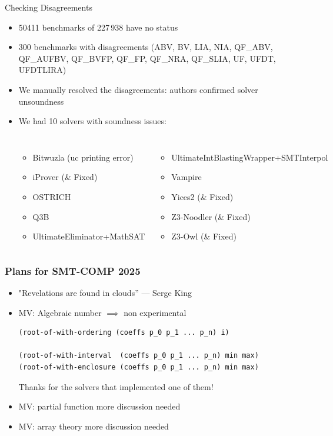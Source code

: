 \documentclass[table]{beamer}
\newcommand\vitem{\vfill\item}
\begin{document}
\begin{frame}{Checking Disagreements}

  \begin{itemize}
  \item  50411 benchmarks of 227\,938 have no status

  \vitem 300 benchmarks with disagreements (ABV,
  BV,
  LIA,
  NIA,
  QF\_ABV,
  QF\_AUFBV,
  QF\_BVFP,
  QF\_FP,
  QF\_NRA,
  QF\_SLIA,
  UF,
  UFDT,
  UFDTLIRA)

  \vitem We manually resolved the disagreements: authors confirmed solver
  unsoundness
  \vitem We had 10 solvers with soundness issues:
  \begin{columns}
    \begin{itemize}
      \item Bitwuzla (uc printing error)
      \item iProver (\& Fixed)
      \item OSTRICH
      \item Q3B
      \item UltimateEliminator+MathSAT
    \end{itemize}
    \begin{itemize}
      \item UltimateIntBlastingWrapper+SMTInterpol
      \item Vampire
      \item Yices2 (\& Fixed)
      \item Z3-Noodler (\& Fixed)
      \item Z3-Owl (\& Fixed)
    \end{itemize}
\end{columns}

  \end{itemize}
  \end{frame}

\begin{frame}[fragile]
  \frametitle{Plans for SMT-COMP 2025}
  \begin{itemize}
    \item "Revelations are found in clouds” --- Serge King
    \item MV: Algebraic number $\implies$ non experimental
\begin{verbatim}
(root-of-with-ordering (coeffs p_0 p_1 ... p_n) i)

(root-of-with-interval  (coeffs p_0 p_1 ... p_n) min max)
(root-of-with-enclosure (coeffs p_0 p_1 ... p_n) min max)
\end{verbatim}
    Thanks for the solvers that implemented one of them!
    \item MV: partial function more discussion needed
    \item MV: array theory more discussion needed
  \end{itemize}
\end{frame}
\end{document}
